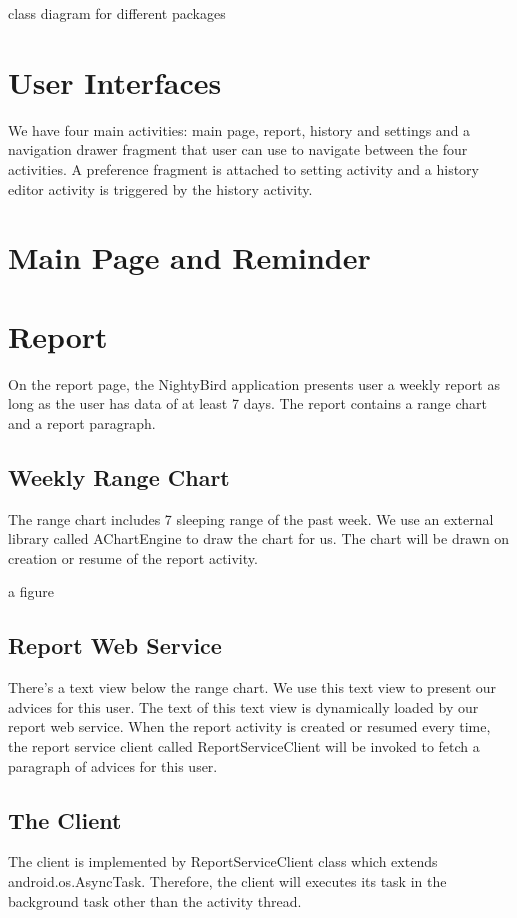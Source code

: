 \documentclass[14pt]{extreport}
\begin{document}
class diagram for different packages

\chapter{User Interfaces}

We have four main activities: main page, report, history and settings and a navigation drawer fragment that user can use to navigate between the four activities. A preference fragment is attached to setting activity and a history editor activity is triggered by the history activity.

\chapter{Main Page and Reminder}

\chapter{Report}
On the report page, the NightyBird application presents user a weekly report as long as the user has data of at least 7 days. The report contains a range chart and a report paragraph.
\section{Weekly Range Chart}
The range chart includes 7 sleeping range of the past week. We use an external library called AChartEngine to draw the chart for us. The chart will be drawn on creation or resume of the report activity.

a figure

\section{Report Web Service}
There's a text view below the range chart. We use this text view to present our advices for this user. The text of this text view is dynamically loaded by our report web service. When the report activity is created or resumed every time, the report service client called ReportServiceClient will be invoked to fetch a paragraph of advices for this user. 

\section{The Client}
The client is implemented by ReportServiceClient class which extends android.os.AsyncTask. Therefore, the client will executes its task in the background task other than the activity thread.
\end{document}
